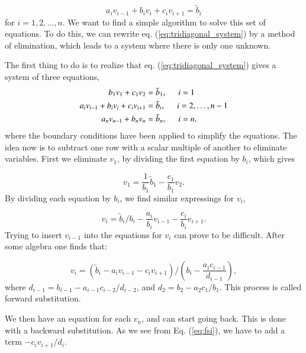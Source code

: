 \documentclass{article}
\begin{document}
\begin{multicols}{2}
\begin{equation}\label{eq:tridiagonal_system}
  a_iv_{i-1}+b_iv_i+c_iv_{i+1} = \tilde{b}_i
\end{equation}
for $i=1,2,\dots,n$. We want to find a simple algorithm to solve this set of equations. To do this, we can rewrite eq. (\ref{eq:tridiagonal_system}) by a method of elimination, which leads to a system where there is only one unknown. 

The first thing to do is to realize that eq. (\ref{eq:tridiagonal_system}) gives a system of three equations,
\begin{align}
	b_1 v_1 + c_1 v_2 &= \tilde{b}_1, \hspace{0.5cm} i = 1  \\
	a_i v_{i-1} + b_i v_i + c_i v_{i+1} &= \tilde{b}_i, \hspace{0.5cm} i = 2, \dots, n - 1 \\
	a_n v_{n-1} + b_n v_n &= \tilde{b}_n, \hspace{0.5cm} i = n  ,
\end{align}
where the boundary conditions have been applied to simplify the equations. The idea now is to subtract one row with a scalar multiple of another to eliminate variables. First we eliminate $v_1$, by dividing the first equation by $b_i$, which gives

\begin{equation}
	v_1 = \frac{1}{b_1}\tilde{b}_1 - \frac{c_1}{b_1}v_2.
\end{equation}
By dividing each equation by $b_i$, we find similar expressings for $v_i$,

\begin{equation}
	v_i = \tilde{b}_i/b_i - \frac{a_i}{b_i}v_{i-1} - \frac{c_i}{b_i}v_{i+1}.
\end{equation}
Trying to insert $v_{i-1}$ into the equations for $v_i$ can prove to be difficult. After some algebra one finds that:

\begin{equation}\label{eq:fsi}
	v_i = \left( \tilde{b}_i - a_iv_{i-1} - c_iv_{i+1} \right)/\left( b_i - \frac{a_ic_{i-1}}{d_{i-1}} \right),
\end{equation}
where $d_{i-1} =  b_{i-1} - a_{i-1}c_{i-2}/d_{i-2}$, and $d_{2} = b_2 - a_2c_1/b_1$. This process is called forward substitution.

We then have an equation for each $v_n$, and can start going back. This is done with a backward substitution. As we see from Eq. (\ref{eq:fsi}), we have to add a term $-c_iv_{i+1}/d_i$. \\




\end{multicols}
\end{document}
